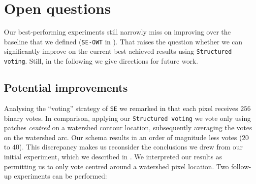 \section{Open questions} %
Our best-performing experiments still narrowly miss on improving over the baseline that we defined ({\tt SE-OWT} in ). That raises the question whether we can %
significantly improve on the current best achieved results using {\tt Structured voting}. Still, in the following we give directions for future work.

\subsection{Potential improvements}

Analysing the ``voting'' strategy of {\tt SE} we remarked in  that each pixel receives $256$ binary votes. In comparison, applying %
our {\tt Structured voting} we vote only using %
patches {\it centred} on a watershed contour location, subsequently averaging the votes on the watershed arc. Our schema results in an order of magnitude less votes ($20$ to $40$). This discrepancy makes us reconsider %
the conclusions we drew from our initial experiment, which we described in . We interpreted our results as permitting %
us to only vote centred around a watershed pixel location. Two follow-up experiments can be performed:

